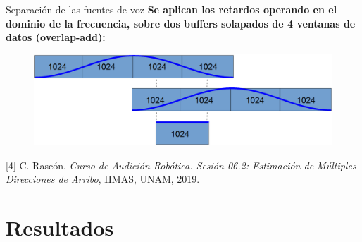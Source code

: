 \documentclass[12pt,aspectratio=169]{beamer}
\begin{document}
	\begin{frame}{Separación de las fuentes de voz}
		\textbf{Se aplican los retardos operando en el dominio de la frecuencia, sobre dos buffers solapados de 4 ventanas de datos (overlap-add):}\\		
		\vspace{5mm}
		\begin{figure}[h]
			\centering
			\includegraphics[width=0.8\linewidth]{figures/Buffers.eps}
		\end{figure}
		\tiny{[4] C. Rascón, \textit{Curso de Audición Robótica. Sesión 06.2: Estimación de Múltiples Direcciones de Arribo}, IIMAS, UNAM, 2019.}
	\end{frame}
	
	\section{Resultados}
	
	
\end{document}
